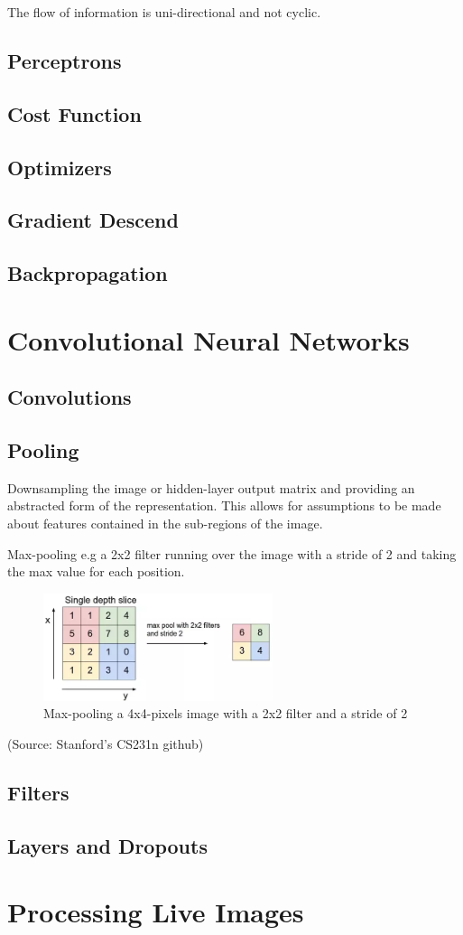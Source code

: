 \documentclass[a4paper,english]{report}
\begin{document}
        The flow of information is uni-directional and not cyclic.

        \section{Perceptrons}

        \section{Cost Function}

        \section{Optimizers}
        \section{Gradient Descend}
        \section{Backpropagation}        
        \chapter{Convolutional Neural Networks}
        \section{Convolutions}
    	\section{Pooling}
    	Downsampling the image or hidden-layer output matrix and providing an abstracted form of the representation. This allows for assumptions to be made about features contained in the sub-regions of the image.
    	
    	Max-pooling e.g a 2x2 filter running over the image with a stride of 2 and taking the max value for each position.
    	
   		\begin{figure}[h]
    		\centering
    		\includegraphics[width=0.6\textwidth]{figures/max_pooling.png}
    		\caption{Max-pooling a 4x4-pixels image with a 2x2 filter and a stride of 2}
    		\label{fig:maxpooling}
    	\end{figure}
    	
    	(Source: Stanford's CS231n github)
    	
        \section{Filters}
        \section{Layers and Dropouts}
        \chapter{Processing Live Images}
    
\end{document}
